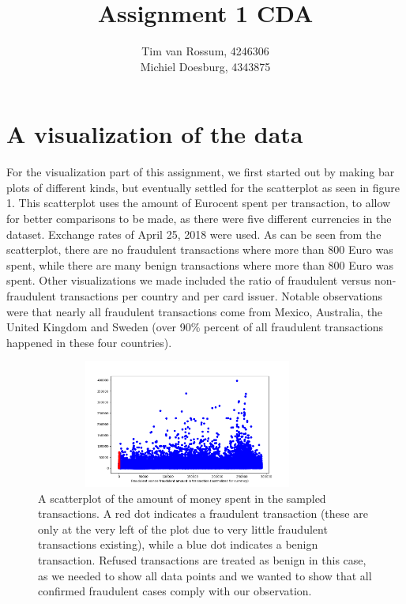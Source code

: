 \documentclass[]{article}
\title{Assignment 1 CDA}
\author{Tim van Rossum, 4246306\\
	Michiel Doesburg, 4343875}
\begin{document}
\maketitle

\section{A visualization of the data}
For the visualization part of this assignment, we first started out by making bar plots of different kinds, but eventually settled  for the scatterplot as seen in figure 1. This scatterplot uses the amount of Eurocent spent per transaction, to allow for better comparisons to be made, as there were five different currencies in the dataset. Exchange rates of April 25, 2018 were used. As can be seen from the scatterplot, there are no fraudulent transactions where more than 800 Euro was spent, while there are many benign transactions where more than 800 Euro was spent. Other visualizations we made included the ratio of fraudulent versus non-fraudulent transactions per country and per card issuer. Notable observations were that nearly all fraudulent transactions come from Mexico, Australia, the United Kingdom and Sweden (over 90\% percent of all fraudulent transactions happened in these four countries).
\begin{figure}[h!]
	\centering
	\includegraphics[width=10cm,height=4.2cm]{Visualizations/AmtFraudvsNonFraud2.png}
	\caption{A scatterplot of the amount of money spent in the sampled transactions. A red dot indicates a fraudulent transaction (these are only at the very left of the plot due to very little fraudulent transactions existing), while a blue dot indicates a benign transaction. Refused transactions are treated as benign in this case, as we needed to show all data points and we wanted to show that all confirmed fraudulent cases comply with our observation.}
\end{figure}
\clearpage
\end{document}
